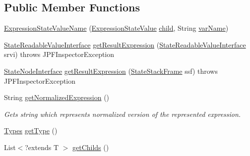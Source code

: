 \subsection*{Public Member Functions}
\begin{DoxyCompactItemize}
\item 
\hyperlink{classgov_1_1nasa_1_1jpf_1_1inspector_1_1server_1_1expression_1_1expressions_1_1_expression_state_value_name_abd343badb3e724f77ca72c0428733a91}{Expression\+State\+Value\+Name} (\hyperlink{classgov_1_1nasa_1_1jpf_1_1inspector_1_1server_1_1expression_1_1expressions_1_1_expression_state_value}{Expression\+State\+Value} \hyperlink{classgov_1_1nasa_1_1jpf_1_1inspector_1_1server_1_1expression_1_1_expression_state_unary_operator_a66041b1f569a361549e28a00f7ca5f2f}{child}, String \hyperlink{classgov_1_1nasa_1_1jpf_1_1inspector_1_1server_1_1expression_1_1expressions_1_1_expression_state_value_name_a5861f8633f2b17e241b6c108a5671be3}{var\+Name})
\item 
\hyperlink{interfacegov_1_1nasa_1_1jpf_1_1inspector_1_1server_1_1programstate_1_1_state_readable_value_interface}{State\+Readable\+Value\+Interface} \hyperlink{classgov_1_1nasa_1_1jpf_1_1inspector_1_1server_1_1expression_1_1expressions_1_1_expression_state_value_name_aa0345fd737e1de438620d6013a4705d5}{get\+Result\+Expression} (\hyperlink{interfacegov_1_1nasa_1_1jpf_1_1inspector_1_1server_1_1programstate_1_1_state_readable_value_interface}{State\+Readable\+Value\+Interface} srvi)  throws J\+P\+F\+Inspector\+Exception 
\item 
\hyperlink{interfacegov_1_1nasa_1_1jpf_1_1inspector_1_1server_1_1programstate_1_1_state_node_interface}{State\+Node\+Interface} \hyperlink{classgov_1_1nasa_1_1jpf_1_1inspector_1_1server_1_1expression_1_1expressions_1_1_expression_state_value_name_afaa68617063e4293691f4bc4f2b844fd}{get\+Result\+Expression} (\hyperlink{classgov_1_1nasa_1_1jpf_1_1inspector_1_1server_1_1programstate_1_1_state_stack_frame}{State\+Stack\+Frame} ssf)  throws J\+P\+F\+Inspector\+Exception 
\item 
String \hyperlink{classgov_1_1nasa_1_1jpf_1_1inspector_1_1server_1_1expression_1_1expressions_1_1_expression_state_value_name_a7dba9eb7d3fe67b1be856b7c890d14fd}{get\+Normalized\+Expression} ()
\begin{DoxyCompactList}\small\item\em Gets string which represents normalized version of the represented expression. \end{DoxyCompactList}\item 
\hyperlink{enumgov_1_1nasa_1_1jpf_1_1inspector_1_1server_1_1expression_1_1_types}{Types} \hyperlink{classgov_1_1nasa_1_1jpf_1_1inspector_1_1server_1_1expression_1_1expressions_1_1_expression_state_value_a9317f49f60c166a2f46f90702e75f22e}{get\+Type} ()
\item 
List$<$?extends T $>$ \hyperlink{classgov_1_1nasa_1_1jpf_1_1inspector_1_1server_1_1expression_1_1_expression_state_unary_operator_ad010bcb9c4e2eb584321b5ceba8e1682}{get\+Childs} ()
\end{DoxyCompactItemize}
